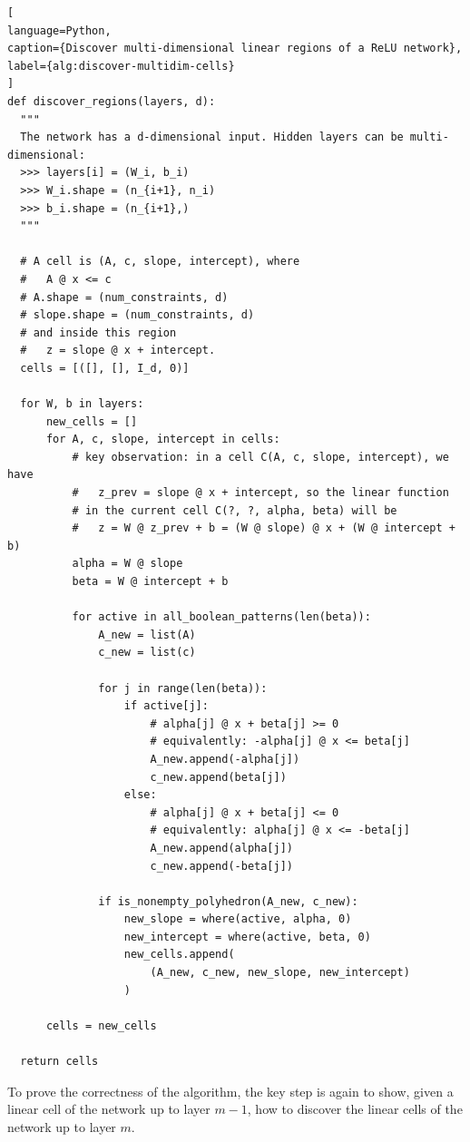 \documentclass[10pt]{extarticle}
\begin{document}
\begin{lstlisting}[
language=Python,
caption={Discover multi-dimensional linear regions of a ReLU network},
label={alg:discover-multidim-cells}
]
def discover_regions(layers, d):
  """
  The network has a d-dimensional input. Hidden layers can be multi-dimensional:
  >>> layers[i] = (W_i, b_i)
  >>> W_i.shape = (n_{i+1}, n_i)
  >>> b_i.shape = (n_{i+1},)
  """

  # A cell is (A, c, slope, intercept), where
  #   A @ x <= c
  # A.shape = (num_constraints, d)
  # slope.shape = (num_constraints, d)
  # and inside this region
  #   z = slope @ x + intercept.
  cells = [([], [], I_d, 0)]

  for W, b in layers:
      new_cells = []
      for A, c, slope, intercept in cells:
          # key observation: in a cell C(A, c, slope, intercept), we have
          #   z_prev = slope @ x + intercept, so the linear function
          # in the current cell C(?, ?, alpha, beta) will be
          #   z = W @ z_prev + b = (W @ slope) @ x + (W @ intercept + b)
          alpha = W @ slope
          beta = W @ intercept + b

          for active in all_boolean_patterns(len(beta)):
              A_new = list(A)
              c_new = list(c)

              for j in range(len(beta)):
                  if active[j]:
                      # alpha[j] @ x + beta[j] >= 0
                      # equivalently: -alpha[j] @ x <= beta[j]
                      A_new.append(-alpha[j])
                      c_new.append(beta[j])
                  else:
                      # alpha[j] @ x + beta[j] <= 0
                      # equivalently: alpha[j] @ x <= -beta[j]
                      A_new.append(alpha[j])
                      c_new.append(-beta[j])

              if is_nonempty_polyhedron(A_new, c_new):
                  new_slope = where(active, alpha, 0)
                  new_intercept = where(active, beta, 0)
                  new_cells.append(
                      (A_new, c_new, new_slope, new_intercept)
                  )

      cells = new_cells

  return cells
\end{lstlisting}

To prove the correctness of the algorithm, the key step is again to show, given a linear cell of
the network up to layer $m-1$, how to discover the linear cells of the network up to layer $m$.
\end{document}
